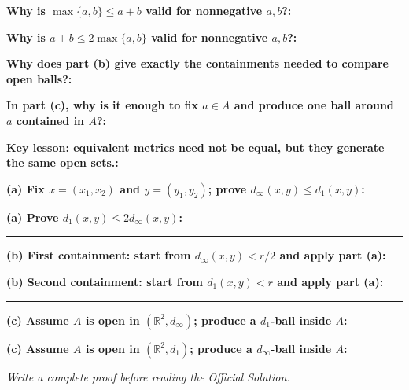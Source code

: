 \documentclass[12pt]{article}
\newcommand{\fillfield}[1]{%
  \par\noindent\textbf{#1:}\enspace\hrulefill\par\vspace{3pt}%
}
\newcommand{\writespace}[1]{\vspace{#1}}
\begin{document}
\bigskip

\begin{tcolorbox}[
  enhanced, breakable,
  colback  = pass3orange,
  colframe = orange!65!black,
  fonttitle = \bfseries,
  title = {Pass 3 \enspace\textbf{--}\enspace Self-Explanation}
]
\fillfield{Why is $\max\{a,b\}\le a+b$ valid for nonnegative $a,b$?}
\fillfield{Why is $a+b \le 2\max\{a,b\}$ valid for nonnegative $a,b$?}
\fillfield{Why does part (b) give exactly the containments needed to compare open balls?}
\fillfield{In part (c), why is it enough to fix $a \in A$ and produce one ball around $a$ contained in $A$?}
\fillfield{Key lesson: equivalent metrics need not be equal, but they generate the same open sets.}
\end{tcolorbox}

\newpage

\begin{tcolorbox}[
  enhanced, breakable,
  colback  = pass4purple,
  colframe = purple!55!black,
  fonttitle = \bfseries,
  title = {Pass 4 \enspace\textbf{--}\enspace Skeleton Proof}
]
\noindent\textbf{(a) Fix $x=(x_1,x_2)$ and $y=(y_1,y_2)$; prove $d_\infty(x,y)\le d_1(x,y)$:}\par
\writespace{1.6cm}
\noindent\textbf{(a) Prove $d_1(x,y)\le 2d_\infty(x,y)$:}\par
\writespace{1.4cm}

\noindent\rule{\linewidth}{0.4pt}\vspace{2pt}

\noindent\textbf{(b) First containment: start from $d_\infty(x,y)<r/2$ and apply part (a):}\par
\writespace{1.4cm}
\noindent\textbf{(b) Second containment: start from $d_1(x,y)<r$ and apply part (a):}\par
\writespace{1.2cm}

\noindent\rule{\linewidth}{0.4pt}\vspace{2pt}

\noindent\textbf{(c) Assume $A$ is open in $(\mathbb{R}^2,d_\infty)$; produce a $d_1$-ball inside $A$:}\par
\writespace{1.3cm}
\noindent\textbf{(c) Assume $A$ is open in $(\mathbb{R}^2,d_1)$; produce a $d_\infty$-ball inside $A$:}\par
\writespace{1.3cm}
\end{tcolorbox}

\newpage

\begin{tcolorbox}[
  enhanced, breakable,
  colback  = pass5gray,
  colframe = black!38,
  fonttitle = \bfseries,
  title = {Pass 5 \enspace\textbf{--}\enspace Full Proof Attempt}
]
\small\itshape Write a complete proof before reading the Official Solution.\par
\normalfont\normalsize
\writespace{19cm}
\end{tcolorbox}
\end{document}

